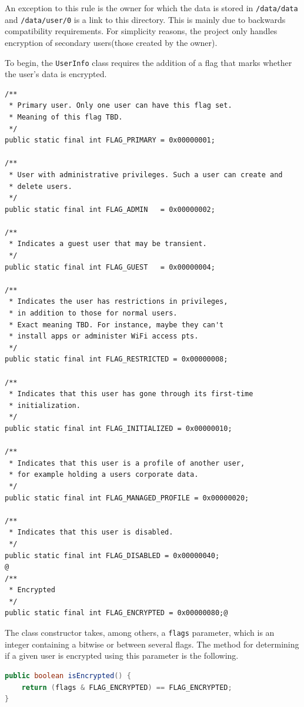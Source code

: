 An exception to this rule is the owner for which the data is stored in \texttt{/data/data} and \texttt{/data/user/0} is a link to this directory. This is mainly due to backwards compatibility requirements. For simplicity reasons, the project only handles encryption of  secondary users(those created by the owner).

To begin, the \texttt{UserInfo} class requires the addition of a flag that marks whether the user's data is encrypted.


\begin{lstlisting}[style=custom1, caption=Encrypted User Flag, label=lst:encr-flag-multi-user]
/**
 * Primary user. Only one user can have this flag set. 
 * Meaning of this flag TBD.
 */
public static final int FLAG_PRIMARY = 0x00000001;

/**
 * User with administrative privileges. Such a user can create and
 * delete users.
 */
public static final int FLAG_ADMIN   = 0x00000002;

/**
 * Indicates a guest user that may be transient.
 */
public static final int FLAG_GUEST   = 0x00000004;

/**
 * Indicates the user has restrictions in privileges, 
 * in addition to those for normal users.
 * Exact meaning TBD. For instance, maybe they can't
 * install apps or administer WiFi access pts.
 */
public static final int FLAG_RESTRICTED = 0x00000008;

/**
 * Indicates that this user has gone through its first-time
 * initialization.
 */
public static final int FLAG_INITIALIZED = 0x00000010;

/**
 * Indicates that this user is a profile of another user, 
 * for example holding a users corporate data.
 */
public static final int FLAG_MANAGED_PROFILE = 0x00000020;

/**
 * Indicates that this user is disabled.
 */
public static final int FLAG_DISABLED = 0x00000040;
@
/**
 * Encrypted
 */
public static final int FLAG_ENCRYPTED = 0x00000080;@
\end{lstlisting}
The class constructor takes, among others, a \texttt{flags} parameter, which is an integer containing a bitwise or between several flags. The method for determining if a given user is encrypted using this parameter is the following.
\begin{lstlisting}[language=Java, numbers=none, caption=isEncrypted method, label=lst:encr-method-multi-user]
public boolean isEncrypted() {
	return (flags & FLAG_ENCRYPTED) == FLAG_ENCRYPTED;
}
\end{lstlisting}

